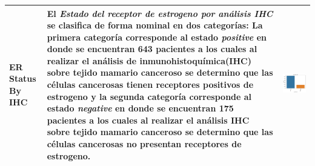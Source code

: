 \begin{table}[!htb]
	\footnotesize
	\begin{threeparttable}
		\begin{tabular}{p{2.5cm} p{7cm} p{6.5cm}} \toprule
			ER Status By IHC
			&El \textit{Estado del receptor de estrogeno por análisis IHC} se clasifica de forma nominal en dos categorías: La primera categoría corresponde al estado \textit{positive} en donde se encuentran 643 pacientes a los cuales al realizar el análisis de inmunohistoquímica(IHC) sobre tejido mamario canceroso se determino que las células cancerosas tienen receptores positivos de estrogeno y la segunda categoría corresponde al estado \textit{negative} en donde se encuentran 175 pacientes a los cuales al realizar el análisis IHC sobre tejido mamario canceroso se determino que las células cancerosas no presentan receptores de estrogeno.
			& \begin{center}\includegraphics[width=1\linewidth]{NOTEBOOK/IMAGENES_DESCRIPTIVAS/13_er_status_ihc}\end{center}
			\\ \hline
			

\end{tabular}
\end{threeparttable}
\end{table}
